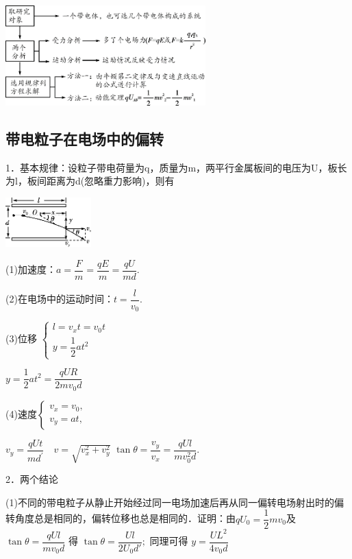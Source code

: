 \begin{center}\includegraphics[width=3.04167in,height=1.52083in]{media/image298.png}\end{center}
\newpage
\subsection{带电粒子在电场中的偏转}

1．基本规律：设粒子带电荷量为q，质量为m，两平行金属板间的电压为U，板长为l，板间距离为d(忽略重力影响)，则有

\begin{center}\includegraphics[width=1.30208in,height=0.75in]{media/image299.png}\end{center}

(1)加速度：$a=\dfrac{F}{m}=\dfrac{q E}{m}=\dfrac{q U}{m d}$.

(2)在电场中的运动时间：$t=\dfrac{l}{v_{0}}$.

(3)位移
$\left\{\begin{array}{l}l=v_{x} t=v_{0} t \\ y=\dfrac{1}{2} a t^2\end{array}\right.$

$y=\dfrac{1}{2} a t^{2}=\dfrac{q U R}{2 m v_{0} d}$

(4)速度$\left\{\begin{array}{l}v_{x}=v_{0}, \quad  \\ v_{y}=a t, \quad\end{array}\right.$

$v_{y}=\dfrac{q U t}{m d^{\prime}} \quad v=\sqrt{v_{x}^{2}+v_{y}^{2}}$\quad
$\tan \theta=\dfrac{v_{y}}{v_{x}}=\dfrac{q U l}{m v_{0}^{2} d}$.

2．两个结论

(1)不同的带电粒子从静止开始经过同一电场加速后再从同一偏转电场射出时的偏转角度总是相同的，偏转位移也总是相同的．证明：由$q U_{0}=\dfrac{1}{2} m v_{0}$及$\tan \theta=\dfrac{q U l}{m v_{0} d}$ 得 $\tan \theta=\dfrac{U l}{2 U_{0} d'} ;$ 同理可得 $y=\dfrac{U L^{2}}{4 v_{0} d}$

